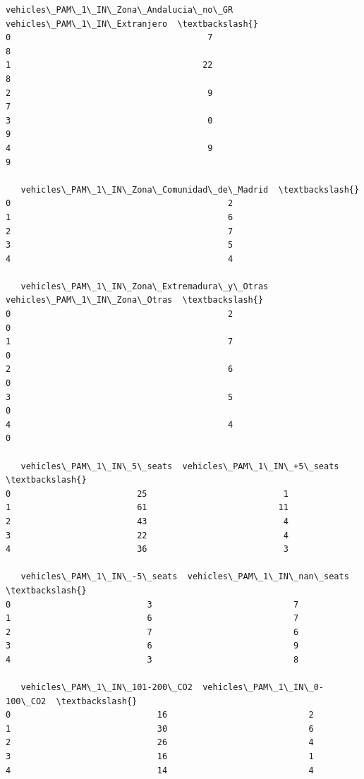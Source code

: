 \documentclass[11pt]{article}
\begin{document}
\begin{tcolorbox}[breakable, size=fbox, boxrule=.5pt, pad at break*=1mm, opacityfill=0]
\begin{Verbatim}[commandchars=\\\{\}]
   vehicles\_PAM\_1\_IN\_Zona\_Andalucia\_no\_GR  vehicles\_PAM\_1\_IN\_Extranjero  \textbackslash{}
0                                       7                             8
1                                      22                             8
2                                       9                             7
3                                       0                             9
4                                       9                             9

   vehicles\_PAM\_1\_IN\_Zona\_Comunidad\_de\_Madrid  \textbackslash{}
0                                           2
1                                           6
2                                           7
3                                           5
4                                           4

   vehicles\_PAM\_1\_IN\_Zona\_Extremadura\_y\_Otras  vehicles\_PAM\_1\_IN\_Zona\_Otras  \textbackslash{}
0                                           2                             0
1                                           7                             0
2                                           6                             0
3                                           5                             0
4                                           4                             0

   vehicles\_PAM\_1\_IN\_5\_seats  vehicles\_PAM\_1\_IN\_+5\_seats  \textbackslash{}
0                         25                           1
1                         61                          11
2                         43                           4
3                         22                           4
4                         36                           3

   vehicles\_PAM\_1\_IN\_-5\_seats  vehicles\_PAM\_1\_IN\_nan\_seats  \textbackslash{}
0                           3                            7
1                           6                            7
2                           7                            6
3                           6                            9
4                           3                            8

   vehicles\_PAM\_1\_IN\_101-200\_CO2  vehicles\_PAM\_1\_IN\_0-100\_CO2  \textbackslash{}
0                             16                            2
1                             30                            6
2                             26                            4
3                             16                            1
4                             14                            4


\end{Verbatim}
\end{tcolorbox}
\end{document}
